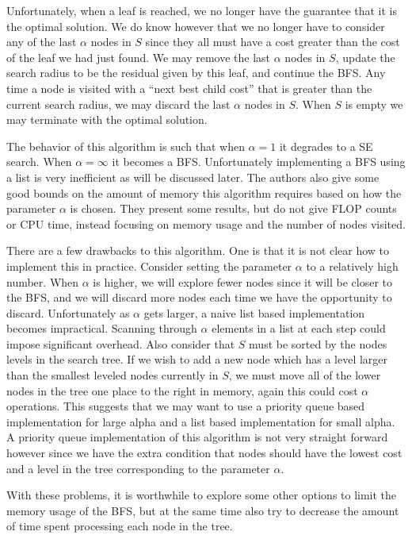 \documentclass[12pt,Bold,letterpaper]{mcgilletdclass}
\begin{document}
Unfortunately, when a leaf is reached, we no longer have the guarantee that it is the optimal solution. We do know however that we no longer have to consider any of the last $\alpha$ nodes in $S$ since they all must have a cost greater than the cost of the leaf we had just found. We may remove the last $\alpha$ nodes in $S$, update the search radius to be the residual given by this leaf, and continue the BFS. Any time a node is visited with a ``next best child cost'' that is greater than the current search radius, we may discard the last $\alpha$ nodes in $S$. When $S$ is empty we may terminate with the optimal solution.

The behavior of this algorithm is such that when $\alpha = 1$ it degrades to a SE search. When $\alpha = \infty$ it becomes a BFS. Unfortunately implementing a BFS using a list is very inefficient as will be discussed later. The authors also give some good bounds on the amount of memory this algorithm requires based on how the parameter $\alpha$ is chosen. They present some results, but do not give FLOP counts or CPU time, instead focusing on memory usage and the number of nodes visited.

There are a few drawbacks to this algorithm. One is that it is not clear how to implement this in practice. Consider setting the parameter $\alpha$ to a relatively high number. When $\alpha$ is higher, we will explore fewer nodes since it will be closer to the BFS, and we will discard more nodes each time we have the opportunity to discard. Unfortunately as $\alpha$ gets larger, a naive list based implementation becomes impractical. Scanning through $\alpha$ elements in a list at each step could impose significant overhead. Also consider that $S$ must be sorted by the nodes levels in the search tree. If we wish to add a new node which has a level larger than the smallest leveled nodes currently in $S$, we must move all of the lower nodes in the tree one place to the right in memory, again this could cost $\alpha$ operations. This suggests that we may want to use a priority queue based implementation for large alpha and a list based implementation for small alpha. A priority queue implementation of this algorithm is not very straight forward however since we have the extra condition that nodes should have the lowest cost and a level in the tree corresponding to the parameter $\alpha$. 

With these problems, it is worthwhile to explore some other options to limit the memory usage of the BFS, but at the same time also try to decrease the amount of time spent processing each node in the tree.
\end{document}
